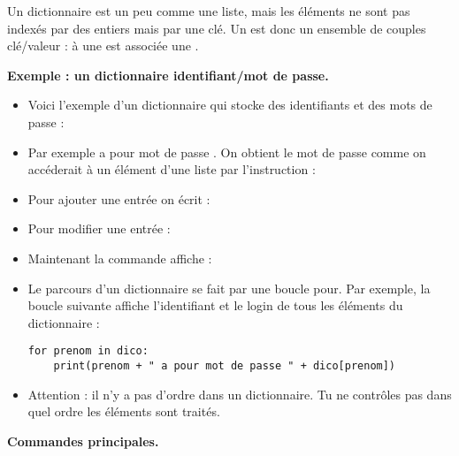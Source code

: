 \documentclass[11pt,class=report,crop=false]{standalone}
\begin{document}
\begin{cours}[Dictionnaire]


Un dictionnaire est un peu comme une liste, mais les éléments ne sont pas indexés par des entiers mais par une \og{}clé\fg{}. 
Un  est donc un ensemble de couples clé/valeur : à une  est associée une .

\bigskip

\textbf{Exemple : un dictionnaire identifiant/mot de passe.}

\begin{itemize}
  \item Voici l'exemple d'un dictionnaire  qui stocke des identifiants et des mots de passe : 

  \item Par exemple  a pour mot de passe . On obtient le mot de passe
comme on accéderait à un élément d'une liste par l'instruction :

  \item Pour ajouter une entrée on écrit : 

  \item Pour modifier une entrée : 
 
  \item Maintenant la commande  affiche :

  \item Le parcours d'un dictionnaire se fait par une boucle \og{}pour\fg{}. Par exemple, la boucle suivante affiche l'identifiant et le login de tous les éléments du dictionnaire :
\begin{lstlisting}
for prenom in dico:
    print(prenom + " a pour mot de passe " + dico[prenom])
\end{lstlisting}

  \item Attention : il n'y a pas d'ordre dans un dictionnaire. Tu ne contrôles pas dans quel ordre les éléments sont traités.
\end{itemize}
\bigskip

\textbf{Commandes principales.}


\end{cours}
\end{document}
